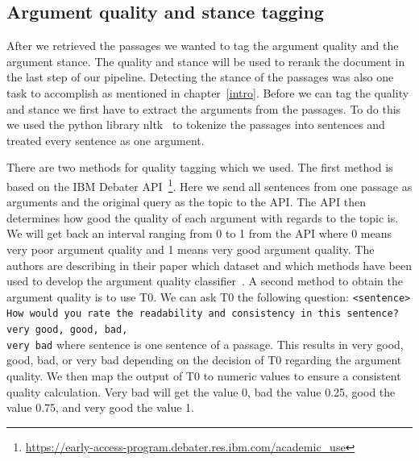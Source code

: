     \subsection{Argument quality and stance tagging}
        After we retrieved the passages we wanted to tag the argument quality and the argument stance. The quality and stance will be used to rerank the document in the last step of our pipeline. Detecting the stance of the passages was also one task to accomplish as mentioned in chapter~\ref{intro}. Before we can tag the quality and stance we first have to extract the arguments from the passages. To do this we used the python library nltk~\cite{BirdLK2009} to tokenize the passages into sentences and treated every sentence as one argument.\par
        There are two methods for quality tagging which we used. The first method is based on the IBM Debater API~\footnote{\url{https://early-access-program.debater.res.ibm.com/academic_use}}. Here we send all sentences from one passage as arguments and the original query as the topic to the API. The API then determines how good the quality of each argument with regards to the topic is. We will get back an interval ranging from 0 to 1 from the API where 0 means very poor argument quality and 1 means very good argument quality. The authors \citeauthor{ToledoG2019} are describing in their paper which dataset and which methods have been used to develop the argument quality classifier~\cite{ToledoG2019}. A second method to obtain the argument quality is to use T0. We can ask T0 the following question: \texttt{<sentence> How would you rate the readability and
        consistency in this sentence? very good, good, bad,\\ very bad} where sentence is one sentence of a passage. This results in very good, good, bad, or very bad depending on the decision of T0 regarding the argument quality. We then map the output of T0 to numeric values to ensure a consistent quality calculation. Very bad will get the value 0, bad the value 0.25, good the value 0.75, and very good the value 1.\par
